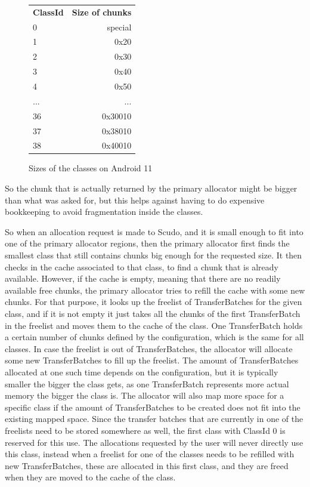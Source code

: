 \documentclass[a4paper,11pt,oneside]{report}
\begin{document}
\begin{figure}[h!]
  \centering
  \begin{tabular}{lr}
    \textbf{ClassId} & \textbf{Size of chunks} \\
    0                & special                 \\
    1                & 0x20                    \\
    2                & 0x30                    \\
    3                & 0x40                    \\
    4                & 0x50                    \\
    ...              & ...                     \\
    36               & 0x30010                 \\
    37               & 0x38010                 \\
    38               & 0x40010                
  \end{tabular}
  \caption{Sizes of the classes on Android 11}
  \label{fig:ScudoAndroidClasses}
\end{figure}

So the chunk that is actually returned by the primary allocator might be bigger
than what was asked for, but this helps against having to do expensive bookkeeping
to avoid fragmentation inside the classes.

So when an allocation request is made to Scudo, and it is small enough to fit into
one of the primary allocator regions, then the primary allocator first finds the
smallest class that still contains chunks big enough for the requested size. It
then checks in the cache associated to that class, to find a chunk that is already
available. However, if the cache is empty, meaning that there are no readily
available free chunks, the primary allocator tries to refill the cache with some
new chunks. For that purpose, it looks up the freelist of TransferBatches for the
given class, and if it is not empty it just takes all the chunks of the first
TransferBatch in the freelist and moves them to the cache of the class. One
TransferBatch holds a certain number of chunks defined by the configuration,
which is the same for all classes.
In case the freelist is out of TransferBatches, the allocator will allocate
some new TransferBatches to fill up the freelist. The amount of TransferBatches
allocated at one such time depends on the configuration, but it is typically
smaller the bigger the class gets, as one TransferBatch represents more actual
memory the bigger the class is. The allocator will also map more space for a
specific class if the amount of TransferBatches to be created does not fit into
the existing mapped space.
Since the transfer batches that are currently in one of the freelists need to
be stored somewhere as well, the first class with ClassId 0 is reserved for
this use. The allocations requested by the user will never directly use this
class, instead when a freelist for one of the classes needs to be refilled
with new TransferBatches, these are allocated in this first class, and they
are freed when they are moved to the cache of the class.
\end{document}
